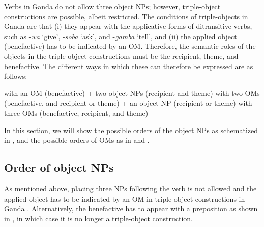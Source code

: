 \documentclass[output=paper,
            colorlinks, citecolor=brown
            ,draftmode
		  ]{langscibook}
\begin{document}
Verbs in Ganda do not allow three object NPs; however, triple-object constructions are possible, albeit restricted. The conditions of triple-objects in Ganda are that (i) they appear with the applicative forms of ditransitive verbs, such as -\textit{wa} ‘give’, -\textit{soba} ‘ask’, and -\textit{gamba} ‘tell’, and (ii) the applied object (benefactive) has to be indicated by an OM. Therefore, the semantic roles of the objects in the triple-object constructions must be the recipient, theme, and benefactive. The different ways in which these can therefore be expressed are as follows:

\ea%
    \label{ex:yoneda:42}
    \ea\label{ex:yoneda:42a} with an OM (benefactive) + two object NPs (recipient and theme)
    \ex\label{ex:yoneda:42b} with two OMs (benefactive, and recipient or theme) + an object NP (recipient or theme) 
    \ex\label{ex:yoneda:42c} with three OMs (benefactive, recipient, and theme)
    \z
\z


    In this section, we will show the possible orders of the object NPs as schematized in , and the possible orders of OMs as in  and .


\subsection{Order of object NPs}
\label{sec:yoneda:4.1}


As mentioned above, placing three NPs following the verb is not allowed  and the applied object has to be indicated by an OM in triple-object constructions in Ganda . Alternatively, the benefactive has to appear with a preposition as shown in , in which case it is no longer a triple-object construction.



\ea%
    \label{ex:yoneda:43}
    \z
\z
\end{document}
